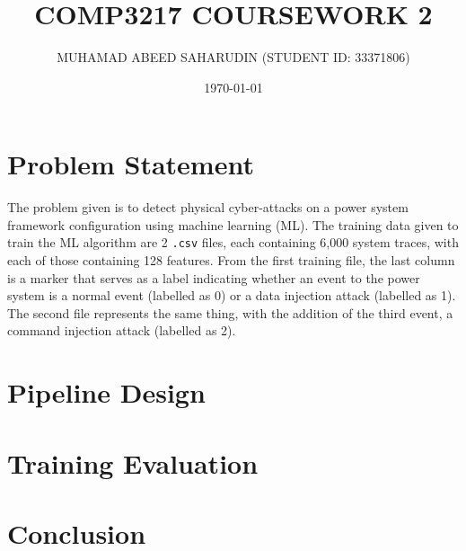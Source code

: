 \documentclass[12pt]{article}
\title{COMP3217 COURSEWORK 2}
\author{MUHAMAD ABEED SAHARUDIN (STUDENT ID: 33371806)}
\date{\today}
\begin{document}
    \maketitle

    \section{Problem Statement}

        The problem given is to detect physical cyber-attacks on a power system framework configuration using machine
        learning (ML). The training data given to train the ML algorithm are 2 \verb|.csv| files, each containing 6,000
        system traces, with each of those containing 128 features. From the first training file, the last column is a 
        marker that serves as a label indicating whether an event to the power system is a normal event (labelled as 0) 
        or a data injection attack (labelled as 1). The second file represents the same thing, with the addition of the 
        third event, a command injection attack (labelled as 2).

    \section{Pipeline Design}

    \section{Training Evaluation}

    \section{Conclusion}
\end{document}
